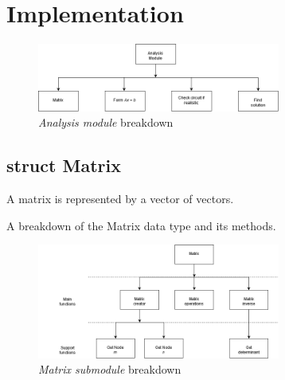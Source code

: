 \documentclass[a4paper, titlepage]{article}
\begin{document}
    \pagebreak
    \section{Implementation}
    \begin{figure}[htp]
        \centering
        \includegraphics[width=80mm,scale=1]{Analysis breakdown}
        \caption{\textit{Analysis module} breakdown}
        \label{fig:figure3}
    \end{figure}
    \subsection{struct Matrix}
    A matrix is represented by a vector of vectors.
    \par
    A breakdown of the Matrix data type and its methods.
    \begin{figure}[htp]
        \centering
        \includegraphics[width=80mm,scale=1]{Matrix struct}
        \caption{\textit{Matrix submodule} breakdown}
        \label{fig:figure3}
    \end{figure}

    
    \pagebreak
    \printbibliography[title={References}]
\end{document}
